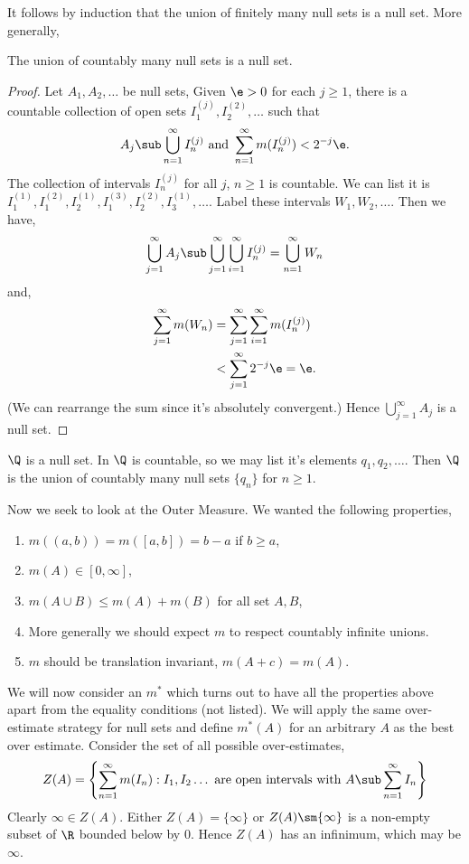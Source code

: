 \noindent
It follows by induction that the union of finitely many null sets is a null set. More generally,
\begin{nlemma}
  The union of countably many null sets is a null set.
\end{nlemma}
\begin{proof}
  Let $A_1, A_2, \dots$ be null sets, Given $\e > 0$ for each $j \ge 1$, there is a countable collection of open sets $I_1^{(j)}, I_2^{(2)}, \dots$ such that
  $$ A_j \sub \bigcup_{n=1}^\infty I_{n}^{(j)} \text{ and } \sum_{n=1}^\infty m(I_n^{(j)}) < 2^{-j}\e.$$
  The collection of intervals $I_n^{(j)}$ for all $j$, $n \ge 1$ is countable. We can list it is $I_1^{(1)}, I_1^{(2)}, I_2^{(1)}, I_1^{(3)}, I_{2}^{(2)}, I_3^{(1)}, \dots$. Label these intervals $W_1, W_2, \dots$. Then we have,
  $$ \bigcup_{j=1}^\infty A_j \sub \bigcup_{j=1}^\infty\bigcup_{i=1}^\infty I_n^{(j)} = \bigcup_{n=1}^\infty W_n$$
  and,
  \begin{align*}
    \sum_{j=1}^\infty m(W_n) &= \sum_{j=1}^\infty \sum_{i=1}^\infty m(I_n^{(j)}) \\
    &< \sum_{j=1}^\infty 2^{-j}\e = \e.
  \end{align*}
  (We can rearrange the sum since it's absolutely convergent.) Hence $\bigcup_{j=1}^\infty A_j$ is a null set.
\end{proof}

\begin{eg}
  $\Q$ is a null set. In $\Q$ is countable, so we may list it's elements $q_1, q_2, \dots$. Then $\Q$ is the union of countably many null sets $\{q_n\}$ for $n \ge 1$.
\end{eg}

\noindent
Now we seek to look at the Outer Measure. We wanted the following properties,
\begin{enumerate}
  \item $m((a, b)) = m([a, b]) = b - a$ if $b \ge a$,
  \item $m(A) \in [0, \infty]$,
  \item $m(A \cup B) \le m(A) + m(B)$ for all set $A, B$,
  \item More generally we should expect $m$ to respect countably infinite unions.
  \item $m$ should be translation invariant, $m(A + c) = m(A)$.
\end{enumerate}

\noindent
We will now consider an $m^*$ which turns out to have all the properties above apart from the equality conditions (not listed). We will apply the same over-estimate strategy for null sets and define $m^*(A)$ for an arbitrary $A$ as the best over estimate. Consider the set of all possible over-estimates,
$$ Z(A) = \left\{ \sum_{n=1}^\infty m(I_n) : I_1, I_2 \dots \text{ are open intervals with } A \sub \sum_{n=1}^\infty I_n \right\} $$
Clearly $\infty \in Z(A)$. Either $Z(A) = \{\infty\}$ or $Z(A)\sm \{\infty \}$ is a non-empty subset of $\R$ bounded below by $0$. Hence $Z(A)$ has an infinimum, which may be $\infty$.

